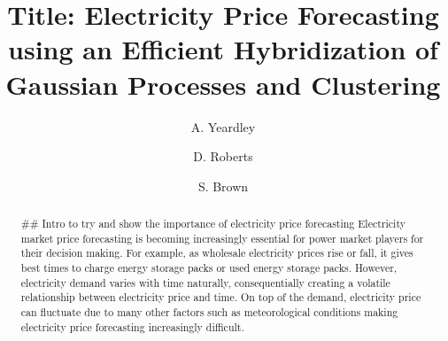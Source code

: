 \documentclass[3p,review,authoryear,10pt]{elsarticle}
\begin{document}
\linenumbers
\begin{frontmatter}

\title{Title: Electricity Price Forecasting using an Efficient Hybridization of Gaussian Processes and Clustering}

\author{A. Yeardley}
\author{D. Roberts}
\author[]{S. Brown }

\address{Department of Chemical and Biological Engineering, The University of Sheffield, Sheffield S10 2TN}



\begin{abstract}

## Intro to try and show the importance of electricity price forecasting
Electricity market price forecasting is becoming increasingly essential for power market players for their decision making. For example, as wholesale electricity prices rise or fall, it gives best times to charge energy storage packs or used energy storage packs. However, electricity demand varies with time naturally, consequentially creating a volatile relationship between electricity price and time. On top of the demand, electricity price can fluctuate due to many other factors such as meteorological conditions making electricity price forecasting increasingly difficult.


\end{abstract}
\end{frontmatter}
\end{document}
